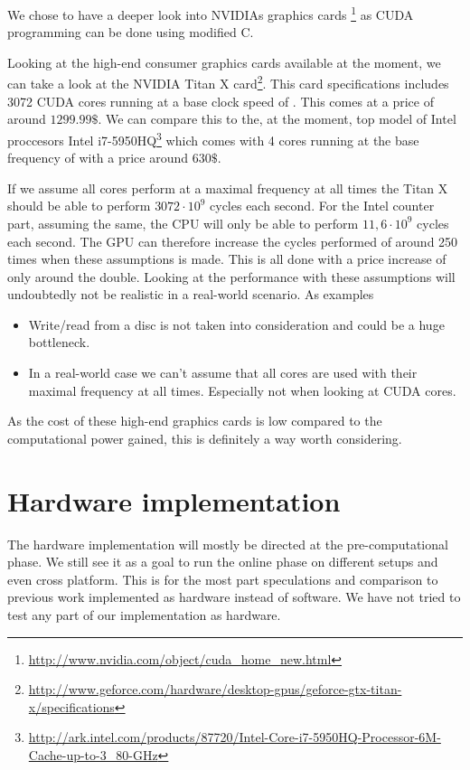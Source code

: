 We chose to have a deeper look into NVIDIAs graphics cards
\footnote{\url{http://www.nvidia.com/object/cuda_home_new.html}}
as CUDA programming can be done using modified C. 

Looking at the high-end consumer graphics cards available at the
moment, we can take a look at the NVIDIA Titan X
card\footnote{\url{http://www.geforce.com/hardware/desktop-gpus/geforce-gtx-titan-x/specifications}}. This
card specifications includes 3072 CUDA cores running at a base clock
speed of . This comes at a price of around
$1299.99\$$. We can compare this to the, at the moment, top model of Intel
proccesors Intel
i7-5950HQ\footnote{\url{http://ark.intel.com/products/87720/Intel-Core-i7-5950HQ-Processor-6M-Cache-up-to-3_80-GHz}}
which comes with 4 cores running at the base frequency of
 with a price around $630\$$.

If we assume all cores perform at a maximal frequency at all times the
Titan X should be able to perform $3072 \cdot 10^9$ cycles each
second. For the Intel counter part, assuming the same, the CPU will
only be able to perform $11,6 \cdot 10^9$ cycles each second. The GPU
can therefore increase the cycles performed of around 250 times when
these assumptions is made. This is all done with a price increase of
only around the double. Looking at the performance with these
assumptions will undoubtedly not be realistic in a real-world
scenario. As examples
\begin{itemize}
\item Write/read from a disc is not taken into
consideration and could be a huge bottleneck. 
\item In a real-world case we can't assume that all cores are used
  with their maximal frequency at all times. Especially not when
  looking at CUDA cores.
\end{itemize}
As the cost of these high-end graphics cards is low compared to
the computational power gained, this is definitely a way worth considering.

\section{Hardware implementation}

The hardware implementation will mostly be directed at the
pre-computational phase. We still see it as a goal to run the online
phase on different setups and even cross platform. This is for the
most part speculations and comparison to previous work implemented as
hardware instead of software. We have not tried to test any part of
our implementation as hardware.

